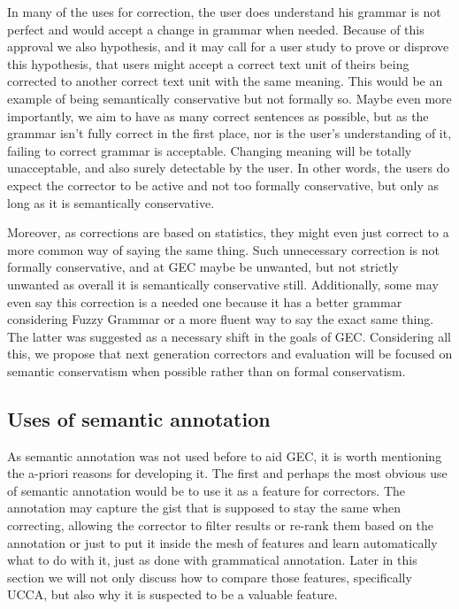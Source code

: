 \documentclass[english]{article}
\begin{document}
{In many of the uses for correction,
the user does understand his grammar is not perfect and would accept
a change in grammar when needed. Because of this approval we also
hypothesis, and it may call for a user study to prove or disprove
this hypothesis, that users might accept a correct text unit of theirs
being corrected to another correct text unit with the same meaning.
This would be an example of being semantically conservative but not formally so.
Maybe even more importantly, we aim to have as many correct sentences
as possible, but as the grammar isn't fully correct in the first place,
nor is the user's understanding of it, failing to correct grammar
is acceptable. Changing meaning will be totally unacceptable, and
also surely detectable by the user. In other words, the users do expect
the corrector to be active and not too formally conservative, but
only as long as it is semantically conservative. 

Moreover, as corrections are based on statistics, they might even
just correct to a more common way of saying the same thing. Such unnecessary
correction is not formally conservative, and at GEC maybe be unwanted, but not strictly unwanted as overall
it is semantically conservative still. Additionally, some may even
say this correction is a needed one because it has a better grammar considering
Fuzzy Grammar\cite{lakoff1973fuzzy,madnani2011they} or a more fluent
way to say the exact same thing. The latter was suggested as a necessary
shift in the goals of GEC\cite{sakaguchi2016reassessing}.
Considering all this, we propose that next generation correctors and evaluation will be focused on semantic conservatism
when possible rather than on formal conservatism.

\subsection{Uses of semantic annotation}

As semantic annotation was not used before to aid GEC, it is worth mentioning the a-priori reasons for developing
it. The first and perhaps the most obvious use of semantic annotation
would be to use it as a feature for correctors. The annotation may
capture the gist that is supposed to stay the same when correcting,
allowing the corrector to filter results or re-rank them based on
the annotation or just to put it inside the mesh of features and learn
automatically what to do with it, just as done with grammatical annotation.
Later in this section we will not only discuss how to compare those
features, specifically UCCA, but also why it is suspected to be a
valuable feature.

}
\end{document}
